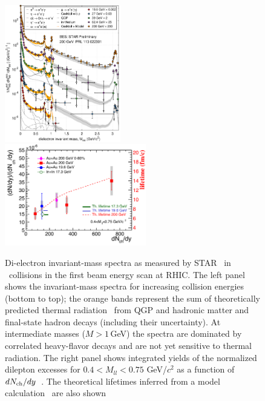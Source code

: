 \begin{figure}[tbh]
\centerline{
\includegraphics[width=0.45\textwidth]{fig/dNeedM-star}
\includegraphics[width=0.55\textwidth]{fig/excessLMRTheoryComp_tau1}
}
\caption[STAR Beam Energy Scan results on di-electron yields]{Di-electron invariant-mass spectra as measured by
STAR~\cite{Adamczyk:2013caa,Huck:2014mfa} in \AuAu\ collisions in the first beam
energy scan at RHIC. The left panel shows the invariant-mass spectra for increasing
collision energies (bottom to top); the orange bands represent the sum of theoretically
predicted thermal radiation~\cite{Rapp:2013nxa} from QGP and hadronic matter
and final-state hadron decays (including their uncertainty). At intermediate masses
($M>1$\,GeV) the spectra are dominated by correlated heavy-flavor decays and are not yet
sensitive to thermal radiation. 
The right panel shows integrated yields of the normalized dilepton excesses 
for $0.4<M_{ll}<0.75$ GeV/$c^{2}$ as a function of $dN_{\rm ch}/dy$~\cite{Adamczyk:2015bha,Specht:2010xu}. 
The theoretical lifetimes inferred from a model calculation~\cite{Rapp:2014hha} are also shown
}
\label{fig:star-ee}
\end{figure}
